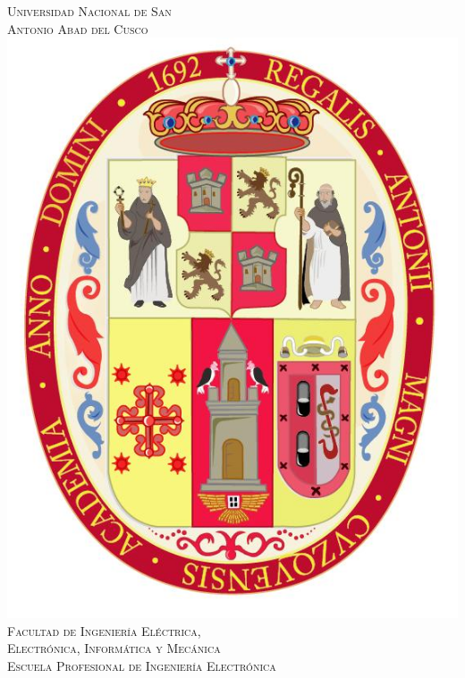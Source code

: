 \documentclass[a4paper, 12pt]{article}
\begin{document}
\begin{titlepage}
     \newcommand{\HRule}{\rule{\linewidth}{0.5mm}}
     \center
     \textsc{\LARGE  Universidad Nacional de San \\[0.2cm] Antonio Abad del Cusco}\\[1.5cm]
	 \includegraphics[scale=0.3]{figures/escudo.jpg}\\[1cm]
     \textsc{\Large Facultad de Ingeniería Eléctrica, \\Electrónica, Informática y Mecánica}\\[0.5cm]
     \textsc{\large Escuela Profesional de Ingeniería Electrónica}\\[5mm]
	 

\end{titlepage}
\end{document}
